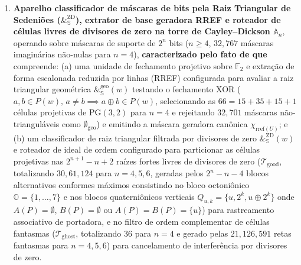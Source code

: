 \documentclass[12pt,a4paper]{article}
\begin{document}
\begin{enumerate}[leftmargin=20pt,itemsep=4pt]
    \item \textbf{Aparelho classificador de m\'ascaras de bits pela Raiz Triangular de Sedeni\~oes ($\&_{\mathbb{S}}^{\mathrm{ZD}}$), extrator de base geradora RREF e roteador de c\'elulas livres de divisores de zero na torre de Cayley--Dickson $\mathbb{A}_n$}, operando sobre m\'ascaras de suporte de $2^n$ bits ($n \ge 4$, $32{,}767$ m\'ascaras imagin\'arias n\~ao-nulas para $n = 4$), \textbf{caracterizado pelo fato de que} compreende: (a) uma unidade de fechamento projetivo sobre $\mathbb{F}_2$ e extra\c{c}\~ao de forma escalonada reduzida por linhas (RREF) configurada para avaliar a raiz triangular geom\'etrica $\&_{\mathbb{S}}^{\mathrm{geo}}(w)$ testando o fechamento XOR ($a,b \in P(w),\, a \neq b \implies a \oplus b \in P(w)$, selecionando as $66 = 15 + 35 + 15 + 1$ c\'elulas projetivas de $\mathrm{PG}(3,2)$ para $n = 4$ e rejeitando $32{,}701$ m\'ascaras n\~ao-triangul\'aveis como $\emptyset_{\mathrm{geo}}$) e emitindo a m\'ascara geradora can\^onica $\chi_{\mathrm{rref}(U)}$; e (b) um classificador de raiz triangular filtrada por divisores de zero $\&_{\mathbb{S}}^{\mathrm{ZD}}(w)$ e roteador de ideal de ordem configurado para particionar as c\'elulas projetivas nas $2^{n+1} - n + 2$ ra\'izes fortes livres de divisores de zero ($\mathcal{T}_{\mathrm{good}}$, totalizando $30, 61, 124$ para $n = 4, 5, 6$, geradas pelos $2^n - n - 4$ blocos alternativos conformes m\'aximos consistindo no bloco octoni\^onico $\mathbb{O} = \{1,\dots,7\}$ e nos blocos quaterni\^onicos verticais $Q_{u,k} = \{u, 2^k, u \oplus 2^k\}$ onde $A(P)=\emptyset$, $B(P)=\emptyset$ ou $A(P)=B(P)=\{u\}$) para rastreamento associativo de portadora, e no filtro de ordem complementar de c\'elulas fantasmas ($\mathcal{T}_{\mathrm{ghost}}$, totalizando $36$ para $n = 4$ e gerado pelas $21, 126, 591$ retas fantasmas para $n = 4, 5, 6$) para cancelamento de interfer\^encia por divisores de zero.
\end{enumerate}
\end{document}
